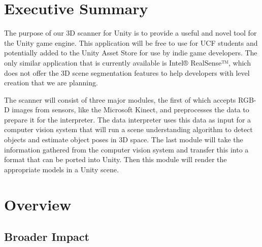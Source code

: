 \documentclass[12pt]{article}
\begin{document}

\setcounter{tocdepth}{3}
\tableofcontents

\cleardoublepage
{} %

\section{Executive Summary}\label{executive-summary}

The purpose of our 3D scanner for Unity is to provide a useful and novel
tool for the Unity game engine. This application will be free to use for
UCF students and potentially added to the Unity Asset Store for use by
indie game developers. The only similar application that is currently
available is Intel® RealSense™, which does not offer the 3D scene
segmentation features to help developers with level creation that we are
planning.

The scanner will consist of three major modules, the first of which
accepts RGB-D images from sensors, like the Microsoft Kinect, and
preprocesses the data to prepare it for the interpreter. The data
interpreter uses this data as input for a computer vision system that
will run a scene understanding algorithm to detect objects and estimate
object poses in 3D space. The last module will take the information
gathered from the computer vision system and transfer this into a format
that can be ported into Unity. Then this module will render the
appropriate models in a Unity scene.

\section{Overview}\label{overview}

\subsection{Broader Impact}\label{broader-impact}
\end{document}
